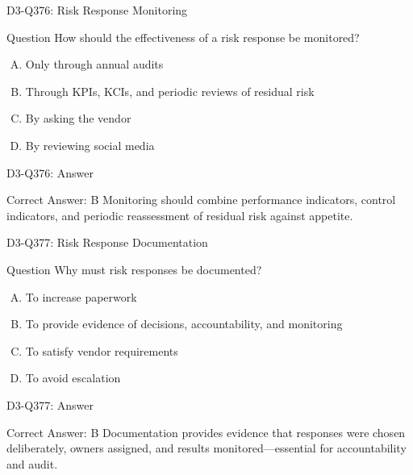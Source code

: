 \documentclass{beamer}
\begin{document}
\begin{frame}{D3-Q376: Risk Response Monitoring}
	\begin{block}{Question}
		How should the effectiveness of a risk response be monitored?
	\end{block}
	\begin{enumerate}[(A)]
		\item Only through annual audits
		\item Through KPIs, KCIs, and periodic reviews of residual risk
		\item By asking the vendor
		\item By reviewing social media
	\end{enumerate}
\end{frame}
\begin{frame}{D3-Q376: Answer}
	\begin{block}{Correct Answer: B}
		Monitoring should combine performance indicators, control indicators, and periodic reassessment of residual risk against appetite.
	\end{block}
\end{frame}

\begin{frame}{D3-Q377: Risk Response Documentation}
	\begin{block}{Question}
		Why must risk responses be documented?
	\end{block}
	\begin{enumerate}[(A)]
		\item To increase paperwork
		\item To provide evidence of decisions, accountability, and monitoring
		\item To satisfy vendor requirements
		\item To avoid escalation
	\end{enumerate}
\end{frame}
\begin{frame}{D3-Q377: Answer}
	\begin{block}{Correct Answer: B}
		Documentation provides evidence that responses were chosen deliberately, owners assigned, and results monitored—essential for accountability and audit.
	\end{block}
\end{frame}
\end{document}
